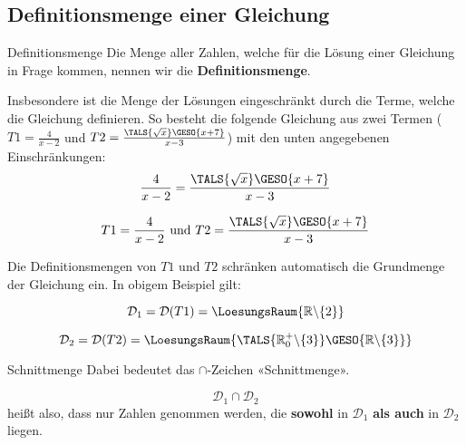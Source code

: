 \newpage

  
\subsection{Definitionsmenge einer
    Gleichung}

\begin{definition}{Definitionsmenge}{}  Die Menge aller Zahlen, welche für die Lösung einer Gleichung in Frage kommen,
  nennen wir die \textbf{Definitionsmenge}.
\end{definition}

  Insbesondere ist die Menge der Lösungen eingeschränkt durch
  die Terme, welche die Gleichung definieren. So besteht die folgende
  Gleichung aus zwei Termen ($T1=\frac{4}{x-2}$ und $T2=\frac{\TALS{\sqrt{x}}\GESO{x+7}}{x-3}$) mit den unten angegebenen
  Einschränkungen:
  $$\frac{4}{x-2}=\frac{\TALS{\sqrt{x}}\GESO{x+7}}{x-3}$$

$$T1=\frac{4}{x-2} \text{ und } T2=\frac{\TALS{\sqrt{x}}\GESO{x+7}}{x-3}$$
  
  Die Definitionsmengen von $T1$ und $T2$ schränken automatisch die
  Grundmenge der Gleichung ein. In obigem Beispiel gilt:
  
  $$\mathcal{D}_1=\mathcal{D}(T1)=\LoesungsRaum{\mathbb{R}\backslash\{2\}}$$

  $$\mathcal{D}_2=\mathcal{D}(T2)=\LoesungsRaum{\TALS{\mathbb{R}^+_0\backslash\{3\}}\GESO{\mathbb{R}\backslash{}\{3\}}}$$

  

  \begin{bemerkung}{Schnittmenge}{}
    Dabei bedeutet das $\cap$-Zeichen «Schnittmenge».

    $$\mathcal{D}_1\cap\mathcal{D}_2$$
    heißt also, dass nur Zahlen genommen werden, die \textbf{sowohl}
    in $\mathcal{D}_1$ \textbf{als auch} in $\mathcal{D}_2$ liegen.
    \end{bemerkung}

  \newpage
    
